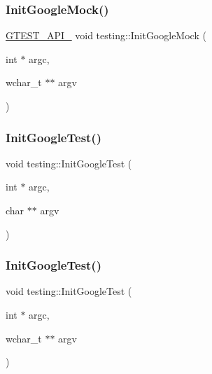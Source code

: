 \mbox{\label{namespacetesting_a20fb86152763dddef67bc1dd8b090800}} 
\subsubsection{\texorpdfstring{InitGoogleMock()}{InitGoogleMock()}\hspace{0.1cm}{\footnotesize\ttfamily [2/2]}}
{\footnotesize\ttfamily \mbox{\hyperlink{gtest-port_8h_aa73be6f0ba4a7456180a94904ce17790}{G\+T\+E\+S\+T\+\_\+\+A\+P\+I\+\_\+}} void testing\+::\+Init\+Google\+Mock (\begin{DoxyParamCaption}\item[{int $\ast$}]{argc,  }\item[{wchar\+\_\+t $\ast$$\ast$}]{argv }\end{DoxyParamCaption})}

\mbox{\label{namespacetesting_afd726ae08c9bd16dc52f78c822d9946b}} 
\subsubsection{\texorpdfstring{InitGoogleTest()}{InitGoogleTest()}\hspace{0.1cm}{\footnotesize\ttfamily [1/2]}}
{\footnotesize\ttfamily void testing\+::\+Init\+Google\+Test (\begin{DoxyParamCaption}\item[{int $\ast$}]{argc,  }\item[{char $\ast$$\ast$}]{argv }\end{DoxyParamCaption})}

\mbox{\label{namespacetesting_ae5a88709a4a7529e30c83242156556b3}} 
\subsubsection{\texorpdfstring{InitGoogleTest()}{InitGoogleTest()}\hspace{0.1cm}{\footnotesize\ttfamily [2/2]}}
{\footnotesize\ttfamily void testing\+::\+Init\+Google\+Test (\begin{DoxyParamCaption}\item[{int $\ast$}]{argc,  }\item[{wchar\+\_\+t $\ast$$\ast$}]{argv }\end{DoxyParamCaption})}

